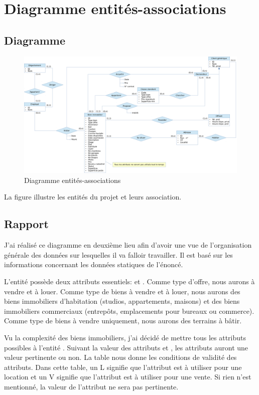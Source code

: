 \chapter{Diagramme entités-associations}

\section{Diagramme}

\begin{figure}
  \centering
  \includegraphics[angle=90,height=0.99\textheight]{IMG/er}
  \caption{Diagramme entités-associations}
  \label{img_er}
\end{figure}

La figure  illustre les entités du projet et leurs association.

\section{Rapport}

J'ai réalisé ce diagramme en deuxième lieu afin d'avoir une vue de l'organisation générale des données sur lesquelles il va falloir travailler. Il est basé sur les informations concernant les données statiques de l'énoncé.

L'entité  possède deux attributs essentiels:  et . Comme type d'offre, nous aurons \og{}à vendre\fg{} et \og{}à louer\fg{}. Comme type de biens à vendre et à louer, nous aurons des biens immobiliers d'habitation (studios, appartements, maisons) et des biens immobiliers commerciaux (entrepôts, emplacements pour bureaux ou commerce). Comme type de biens à vendre uniquement, nous aurons des terrains à bâtir.

Vu la complexité des biens immobiliers, j'ai décidé de mettre tous les attributs possibles à l'entité . Suivant la valeur des attributs  et , les attributs auront une valeur pertinente ou non. La table  nous donne les conditions de validité des attributs. Dans cette table, un \og{}L\fg{} signifie que l'attribut est à utiliser pour une location et un \og{}V\fg{} signifie que l'attribut est à utiliser pour une vente. Si rien n'est mentionné, la valeur de l'attribut ne sera pas pertinente.

